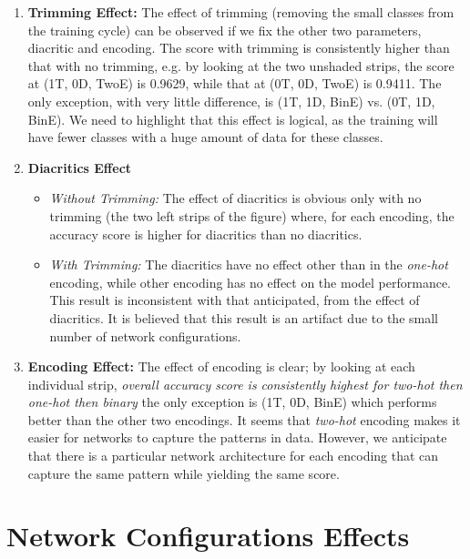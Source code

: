 \begin{enumerate}
 \item \textbf{Trimming Effect:} The effect of trimming (removing the small classes from the training cycle) can be observed if we fix the other two parameters, diacritic and encoding. The score with trimming is consistently higher than that with no trimming, e.g. by looking at the two unshaded strips, the score at (1T, 0D, TwoE) is 0.9629, while that at (0T, 0D, TwoE) is 0.9411. The only exception, with very little difference, is (1T, 1D, BinE) vs. (0T, 1D, BinE). We need to highlight that this effect is logical, as the training will have fewer classes with a huge amount of data for these classes.
 \item \textbf{Diacritics Effect}
 \begin{itemize}
 \item \textit{Without Trimming:} The effect of diacritics is obvious only with no trimming (the two left strips of the figure) where, for each encoding, the accuracy score is higher for diacritics than no diacritics.
 \item \textit{With Trimming:} The diacritics have no effect other than in the \textit{one-hot} encoding, while other encoding has no effect on the model performance. This result is inconsistent with that anticipated, from the effect of diacritics. It is believed that this result is an artifact due to the small number of network configurations.

 \end{itemize} 
 \item \textbf{Encoding Effect:} The effect of encoding is clear; by looking at each individual strip, \textit{overall accuracy score is consistently highest for \textit{two-hot} then \textit{one-hot} then \textit{binary}} the only exception is (1T, 0D, BinE) which performs better than the other two encodings. It seems that \textit{two-hot} encoding makes it easier for networks to capture the patterns in data. However, we anticipate that there is a particular network architecture for each encoding that can capture the same pattern while yielding the same score.
\end{enumerate}




\section{Network Configurations Effects}

